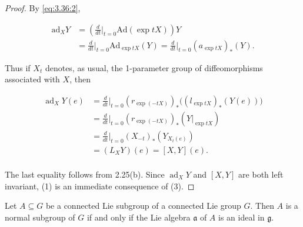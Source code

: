 \begin{proof}
By \eqref{eq:3.36:2},

\begin{equation}
\tag{2}\label{eq:3.47:2}\begin{aligned}\mathrm{ad}_{X}Y&=\left(\frac{d}{dt}\bigg|_{t=0}\mathrm{Ad}(\exp tX)\right)Y\\&=\frac{d}{dt}\bigg|_{t=0}\mathrm{Ad}_{\exp tX}(Y)=\frac{d}{dt}\bigg|_{t=0}(a_{\exp tX})_{*}(Y).\end{aligned}
\end{equation}

Thus if $X_{t}$ denotes, as usual, the 1-parameter group of diffeomorphisms associated with $X$, then

\begin{equation}
\tag{3}\label{eq:3.47:3}
\begin{aligned}{\operatorname{ad}_{X}Y(e)}&{{}=\frac{d}{d t}\bigg|_{t=0}(r_{\exp(-tX)})_{*}\big((l_{\exp tX})_{*}(Y(e))\big)}\\ {}&{{}=\frac{d}{d t}\bigg|_{t=0}(r_{\exp(-tX)})_{*}(Y\big|_{\exp tX})}\\ {}&{{}=\frac{d}{d t}\bigg|_{t=0}(X_{-t})_{*}(Y_{X_{t}(e)})}\\ {}&{{}=(L_{X}Y)(e)=[X,Y](e).}\\ \end{aligned}
\end{equation}

The last equality follows from 2.25(b). Since $\operatorname{ad}_{X}Y$ and $[X,Y]$ are both left invariant, (1) is an immediate consequence of (3).

\end{proof}

\begin{theorem}\label{thm:3.48}
Let $A \subseteq G$ be a connected Lie subgroup of a connected Lie group $G$. Then $A$ is a normal subgroup of $G$ if and only if the Lie algebra $\mathfrak{a}$ of $A$ is an ideal in $\mathfrak{g}$.

\end{theorem}

